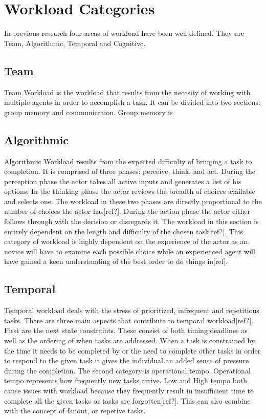\section{Workload Categories}
	In previous research four areas of workload have been well defined. They are Team, Algorithmic, Temporal and Cognitive.
\subsection{Team}
	Team Workload is the workload that results from the necesity of working with multiple agents in order to accomplish a task. It can be divided into two sections: group memory and communication. Group memory is 

\subsection{Algorithmic}
Algorithmic Workload results from the expected difficulty of bringing a task to completion. It is comprised of three phases: perceive, think, and act. During the perception phase the actor takes all active inputs and generates a list of his options. In the thinking phase the actor reviews the breadth of choices available and selects one. The workload in these two phases are directly proportional to the number of choices the actor has[ref?]. During the action phase the actor either follows through with the decision or disregards it. The workload in this section is entirely dependent on the length and difficulty of the chosen task[ref?]. This category of workload is highly dependent on the experience of the actor as an novice will have to examine each possible choice while an experienced agent will have gained a keen understanding of the best order to do things in[ref].

\subsection{Temporal}
Temporal workload deals with the stress of prioritized, infrequent and repetitious tasks. There are three main aspects that contribute to temporal workload[ref?]. First are the next state constraints. These consist of both timing deadlines as well as the ordering of when tasks are addressed. When a task is constrained by the time it needs to be completed by or the need to complete other tasks in order to respond to the given task it gives the individual an added sense of pressure during the completion. The second category is operational tempo. Operational tempo represents how frequently new tasks arrive. Low and High tempo both cause issues with workload because they frequently result in insufficient time to complete all the given tasks or tasks are forgotten[ref?]. This can also combine with the concept of fanout, or repetive tasks. 

